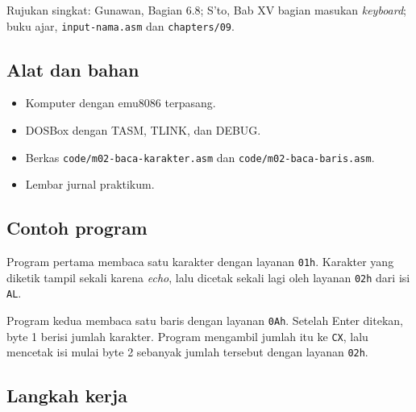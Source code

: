 \begin{rujukan}
Rujukan singkat: Gunawan, Bagian 6.8; S'to, Bab XV bagian masukan
\emph{keyboard}; buku ajar, \texttt{input-nama.asm} dan
\texttt{chapters/09}.
\end{rujukan}

\subsection{Alat dan bahan}

\begin{itemize}
    \item Komputer dengan emu8086 terpasang.
    \item DOSBox dengan TASM, TLINK, dan DEBUG.
    \item Berkas \texttt{code/m02-baca-karakter.asm} dan
          \texttt{code/m02-baca-baris.asm}.
    \item Lembar jurnal praktikum.
\end{itemize}

\subsection{Contoh program}

Program pertama membaca satu karakter dengan layanan \texttt{01h}.
Karakter yang diketik tampil sekali karena \emph{echo}, lalu dicetak
sekali lagi oleh layanan \texttt{02h} dari isi \texttt{AL}.



Program kedua membaca satu baris dengan layanan \texttt{0Ah}.
Setelah Enter ditekan, byte 1 berisi jumlah karakter. Program
mengambil jumlah itu ke \texttt{CX}, lalu mencetak isi mulai byte 2
sebanyak jumlah tersebut dengan layanan \texttt{02h}.



\subsection{Langkah kerja}

